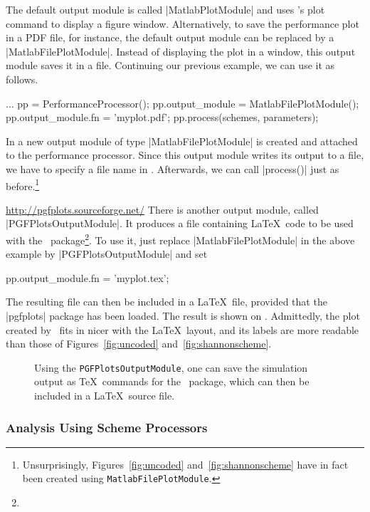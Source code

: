 The default output module is called |MatlabPlotModule| and uses \matlab's plot
command to display a figure window. Alternatively, to save the performance plot
in a PDF file, for instance, the default output module can be replaced by a
|MatlabFilePlotModule|. Instead of displaying the plot in a window, this output
module saves it in a file.  Continuing our previous example, we can use it as
follows.
\begin{Code}
  ...  %
  pp = PerformanceProcessor();
  pp.output_module = MatlabFilePlotModule();
  pp.output_module.fn = 'myplot.pdf';
  pp.process(schemes, parameters);  %
\end{Code}
In  a new output module of type |MatlabFilePlotModule| is
created and attached to the performance processor. Since this output module
writes its output to a file, we have to specify a file name in .
Afterwards, we can call |process()| just as before.\footnote{Unsurprisingly,
Figures~\ref{fig:uncoded} and~\ref{fig:shannonscheme} have in fact been created
using \Verb+Matlab+\-\Verb+FilePlotModule+.}

\urldef{\pgfplotsurl}\url{http://pgfplots.sourceforge.net/}
There is another output module, called |PGFPlotsOutputModule|. It produces a
file containing \LaTeX\ code to be used with the \pgfplots\
package\footnote{\pgfplotsurl}. To use it, just replace |MatlabFilePlotModule|
in the above example by |PGFPlotsOutputModule| and set \eg
\begin{Code}
  pp.output_module.fn = 'myplot.tex';
\end{Code}
The resulting file can then be included in a \LaTeX\ file, provided that the
|pgfplots| package has been loaded.  The result is shown on .
Admittedly, the plot created by \pgfplots\ fits in nicer with the \LaTeX\
layout, and its labels are more readable than those of Figures~\ref{fig:uncoded}
and~\ref{fig:shannonscheme}.

\begin{figure}
  \begin{center}
    
  \end{center}
  \caption{Using the \texttt{PGFPlotsOutputModule}, one can save the simulation
  output as \TeX\ commands for the \pgfplots\ package, which can then be
  included in a \LaTeX\ source file.}
  \label{fig:uncodedpgf}
\end{figure}


\subsubsection{Analysis Using Scheme Processors}

